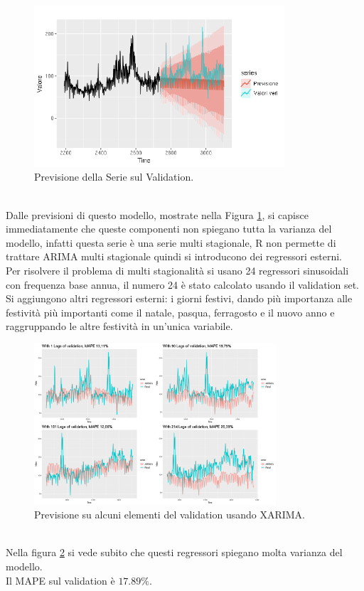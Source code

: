 \documentclass[12pt, onecolumn]{article}
\begin{document}
\begin{figure}[!h]
  \centering
  \includegraphics[width=\linewidth,height=6cm]{imgs/forecast_ar_1.png}
  \caption{Previsione della Serie sul Validation.}
  \label{fig:ARIMA_pred}
\end{figure}\\
Dalle previsioni di questo modello, mostrate nella Figura \ref{fig:ARIMA_pred}, si capisce immediatamente che queste componenti non spiegano tutta la varianza del modello, infatti questa serie è una serie multi stagionale, R non permette di trattare ARIMA multi stagionale quindi si introducono dei regressori esterni.\\
Per risolvere il problema di multi stagionalità si usano 24 regressori sinusoidali con frequenza base annua, il numero 24 è stato calcolato usando il validation set.
Si aggiungono altri regressori esterni: i giorni festivi, dando più importanza alle festività più importanti come il natale, pasqua, ferragosto e il nuovo anno e raggruppando le altre festività in un'unica variabile.
\begin{figure}[!h]
  \centering
  \includegraphics[width=\linewidth,height=6cm]{imgs/forecast_arima.png}
  \caption{Previsione su alcuni elementi del validation usando XARIMA.}
  \label{fig:XARIMA_pred}
\end{figure}\\
Nella figura \ref{fig:XARIMA_pred} si vede subito che questi regressori spiegano molta varianza del modello.\\
Il MAPE sul validation è $17.89\%$. 
\end{document}
